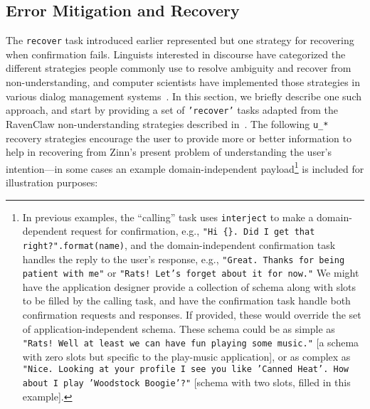 \documentclass[letterpaper,11pt]{article}
\begin{document}
\subsection*{Error Mitigation and Recovery}

The {\tt{recover}} task introduced earlier represented but one strategy for recovering when confirmation fails. Linguists interested in discourse have categorized the different strategies people commonly use to resolve ambiguity and recover from non-understanding, and computer scientists have implemented those strategies in various dialog management systems~\cite{McRoyandHirstAAAI-93,McRoy-KBS-95,BohusPhD-07,BohusandRudnickyCSL-09,HendersonPhD}. In this section, we briefly describe one such approach, and start by providing a set of {\tt{'recover'}} tasks adapted from the RavenClaw non-understanding strategies described in~\cite{BohusandRudnickyHLTEMNLP-05}. The following {\tt{u\_*}} recovery strategies encourage the user to provide more or better information to help in recovering from Zinn's present problem of understanding the user's intention---in some cases an example domain-independent payload\footnote{%
%
  In previous examples, the ``calling'' task uses {\tt{interject}} to make a domain-dependent request for confirmation, e.g., {\tt{"Hi \{\}. Did I get that right?".format(name)}}, and the domain-independent confirmation task handles the reply to the user's response, e.g., {\tt{"Great. Thanks for being patient with me"}} or {\tt{"Rats! Let's forget about it for now."}}  We might have the application designer provide a collection of schema along with slots to be filled by the calling task, and have the confirmation task handle both confirmation requests and responses.  If provided, these would override the set of application-independent schema. These schema could be as simple as {\tt{"Rats! Well at least we can have fun playing some music."}} [a schema with zero slots but specific to the play-music application], or as complex as {\tt{"Nice. Looking at your profile I see you like 'Canned Heat'. How about I play 'Woodstock Boogie'?"}} [schema with two slots, filled in this example].} is included for illustration purposes:
%
\end{document}
